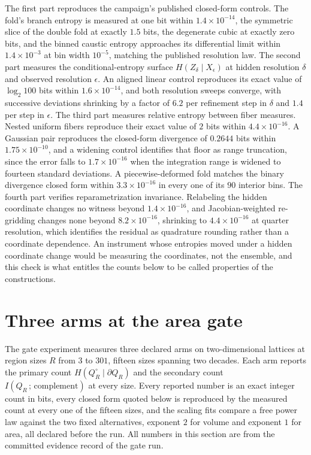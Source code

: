 \documentclass[aps,pre,reprint,nofootinbib]{revtex4-2}
\begin{document}
The first part reproduces the campaign's published closed-form controls.
The fold's branch entropy is measured at one bit within
$1.4\times10^{-14}$, the symmetric slice of the double fold at exactly
$1.5$ bits, the degenerate cubic at exactly zero bits, and the binned
caustic entropy approaches its differential limit within
$1.4\times10^{-3}$ at bin width $10^{-5}$, matching the published
resolution law.  The second part measures the conditional-entropy surface
$H(Z_\delta \mid X_\epsilon)$ at hidden resolution $\delta$ and observed
resolution $\epsilon$.  An aligned linear control reproduces its exact
value of $\log_2 100$ bits within $1.6\times10^{-14}$, and both
resolution sweeps converge, with successive deviations shrinking by a
factor of $6.2$ per refinement step in $\delta$ and $1.4$ per step in
$\epsilon$.  The third part measures relative entropy between fiber
measures.  Nested uniform fibers reproduce their exact value of $2$ bits
within $4.4\times10^{-16}$.  A Gaussian pair reproduces the closed-form
divergence of $0.2644$ bits within $1.75\times10^{-10}$, and a widening
control identifies that floor as range truncation, since the error falls
to $1.7\times10^{-16}$ when the integration range is widened to fourteen
standard deviations.  A piecewise-deformed fold matches the binary
divergence closed form within $3.3\times10^{-16}$ in every one of its
$90$ interior bins.  The fourth part verifies reparametrization
invariance.  Relabeling the hidden coordinate changes no witness beyond
$1.4\times10^{-16}$, and Jacobian-weighted re-gridding changes none
beyond $8.2\times10^{-16}$, shrinking to $4.4\times10^{-16}$ at quarter
resolution, which identifies the residual as quadrature rounding rather
than a coordinate dependence.  An instrument whose entropies moved under
a hidden coordinate change would be measuring the coordinates, not the
ensemble, and this check is what entitles the counts below to be called
properties of the constructions.

\section{Three arms at the area gate}
\label{sec:eg1}

The gate experiment measures three declared arms on two-dimensional
lattices at region sizes $R$ from $3$ to $301$, fifteen sizes spanning
two decades.  Each arm reports the primary count
$H(Q_R^{\circ} \mid \partial Q_R)$ and the secondary count
$I(Q_R\,;\,\text{complement})$ at every size.  Every reported number is
an exact integer count in bits, every closed form quoted below is
reproduced by the measured count at every one of the fifteen sizes, and
the scaling fits compare a free power law against the two fixed
alternatives, exponent $2$ for volume and exponent $1$ for area, all
declared before the run.  All numbers in this section are from the
committed evidence record of the gate run.
\end{document}
